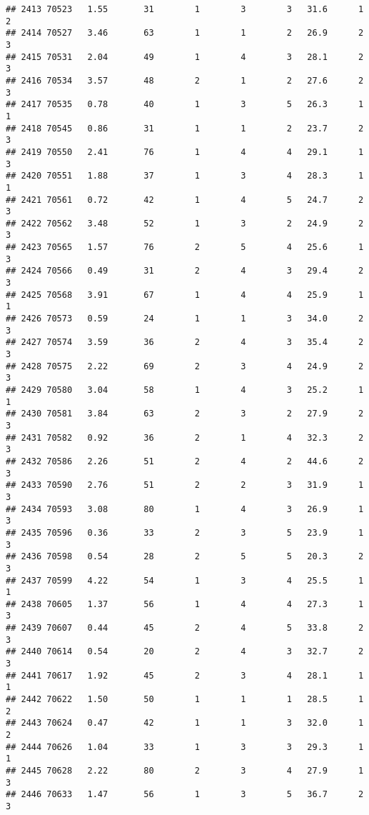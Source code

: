 \documentclass[
]{article}
\begin{document}
\begin{verbatim}
## 2413 70523   1.55       31        1        3        3   31.6      1      2
## 2414 70527   3.46       63        1        1        2   26.9      2      3
## 2415 70531   2.04       49        1        4        3   28.1      2      3
## 2416 70534   3.57       48        2        1        2   27.6      2      3
## 2417 70535   0.78       40        1        3        5   26.3      1      1
## 2418 70545   0.86       31        1        1        2   23.7      2      3
## 2419 70550   2.41       76        1        4        4   29.1      1      3
## 2420 70551   1.88       37        1        3        4   28.3      1      1
## 2421 70561   0.72       42        1        4        5   24.7      2      3
## 2422 70562   3.48       52        1        3        2   24.9      2      3
## 2423 70565   1.57       76        2        5        4   25.6      1      3
## 2424 70566   0.49       31        2        4        3   29.4      2      3
## 2425 70568   3.91       67        1        4        4   25.9      1      1
## 2426 70573   0.59       24        1        1        3   34.0      2      3
## 2427 70574   3.59       36        2        4        3   35.4      2      3
## 2428 70575   2.22       69        2        3        4   24.9      2      3
## 2429 70580   3.04       58        1        4        3   25.2      1      1
## 2430 70581   3.84       63        2        3        2   27.9      2      3
## 2431 70582   0.92       36        2        1        4   32.3      2      3
## 2432 70586   2.26       51        2        4        2   44.6      2      3
## 2433 70590   2.76       51        2        2        3   31.9      1      3
## 2434 70593   3.08       80        1        4        3   26.9      1      3
## 2435 70596   0.36       33        2        3        5   23.9      1      3
## 2436 70598   0.54       28        2        5        5   20.3      2      3
## 2437 70599   4.22       54        1        3        4   25.5      1      1
## 2438 70605   1.37       56        1        4        4   27.3      1      3
## 2439 70607   0.44       45        2        4        5   33.8      2      3
## 2440 70614   0.54       20        2        4        3   32.7      2      3
## 2441 70617   1.92       45        2        3        4   28.1      1      1
## 2442 70622   1.50       50        1        1        1   28.5      1      2
## 2443 70624   0.47       42        1        1        3   32.0      1      2
## 2444 70626   1.04       33        1        3        3   29.3      1      1
## 2445 70628   2.22       80        2        3        4   27.9      1      3
## 2446 70633   1.47       56        1        3        5   36.7      2      3

\end{verbatim}
\end{document}
